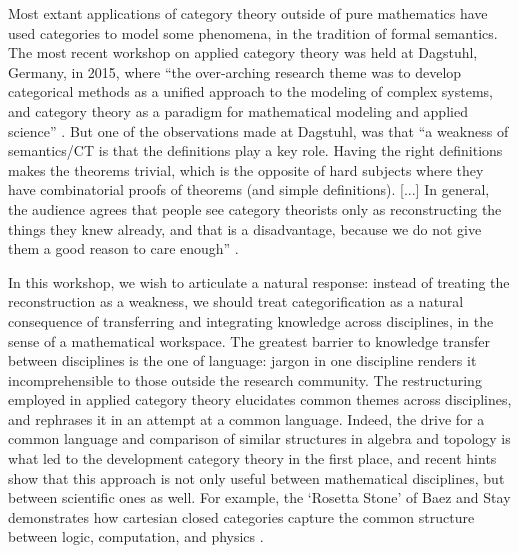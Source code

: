\documentclass{article}
\newcommand{\redout}[1]{{\color{red}#1}}
\begin{document}
Most extant applications of category theory outside of pure mathematics have used categories to model some phenomena, in the tradition of formal semantics. The most recent workshop on applied category theory was held at Dagstuhl, Germany, in 2015, where ``the over-arching research theme was to develop categorical methods as a unified approach to the modeling of complex systems, and category theory as a paradigm for mathematical modeling and applied science'' \cite{dagstuhl}. But one of the observations made at Dagstuhl, was that ``a weakness of semantics/CT is that the definitions play a key role. Having the right definitions makes the theorems trivial, which is the opposite of hard subjects where they have combinatorial proofs of theorems (and simple definitions). [...] In general, the audience agrees that people see category theorists only as reconstructing the things they knew already, and that is a disadvantage, because we do not give them a good reason to care enough'' \cite{selinger_at_dagstuhl}.

In this workshop, we wish to articulate a natural response: instead of treating the reconstruction as a weakness, we should treat categorification as a natural consequence of transferring and integrating knowledge across disciplines, in the sense of a mathematical workspace. The greatest barrier to knowledge transfer between disciplines is the one of language: jargon in one discipline renders it incomprehensible to those outside the research community. The restructuring employed in applied category theory elucidates common themes across disciplines, and rephrases it in an attempt at a common language. Indeed, the drive for a common language and comparison of similar structures in algebra and topology is what led to the development category theory in the first place, and recent hints show that this approach is not only useful between mathematical disciplines, but between scientific ones as well. For example, the `Rosetta Stone' of Baez and Stay demonstrates how cartesian closed categories capture the common structure between logic, computation, and physics \cite{baez_rosetta}. 

\end{document}
